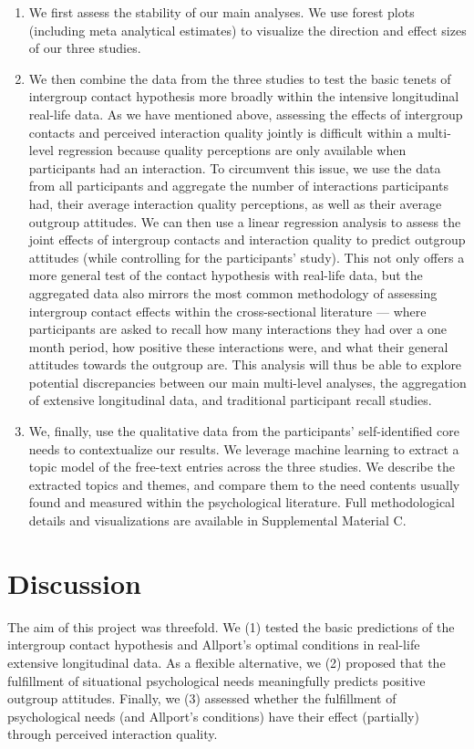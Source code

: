 \documentclass[man, 12pt, a4paper, mask]{apa7}
\theoremstyle{break}
\theoremstyle{plain}
\begin{document}
\begin{enumerate}
\begin{enumerate}
        \item We first assess the stability of our main analyses. We use forest plots (including meta analytical estimates) to visualize the direction and effect sizes of our three studies. 
        \item We then combine the data from the three studies to test the basic tenets of intergroup contact hypothesis more broadly within the intensive longitudinal real-life data. As we have mentioned above, assessing the effects of intergroup contacts and perceived interaction quality jointly is difficult within a multi-level regression because quality perceptions are only available when participants had an interaction. To circumvent this issue, we use the data from all participants and aggregate the number of interactions participants had, their average interaction quality perceptions, as well as their average outgroup attitudes. We can then use a linear regression analysis to assess the joint effects of intergroup contacts and interaction quality to predict outgroup attitudes (while controlling for the participants' study). This not only offers a more general test of the contact hypothesis with real-life data, but the aggregated data also mirrors the most common methodology of assessing intergroup contact effects within the cross-sectional literature --- where participants are asked to recall how many interactions they had over a one month period, how positive these interactions were, and what their general attitudes towards the outgroup are. This analysis will thus be able to explore potential discrepancies between our main multi-level analyses, the aggregation of extensive longitudinal data, and traditional participant recall studies.
        \item We, finally, use the qualitative data from the participants' self-identified core needs to contextualize our results. We leverage machine learning to extract a topic model of the free-text entries across the three studies. We describe the extracted topics and themes, and compare them to the need contents usually found and measured within the psychological literature. Full methodological details and visualizations are available in Supplemental Material C.
    \end{enumerate}
\end{enumerate}





\section{Discussion}
The aim of this project was threefold. We (1) tested the basic predictions of the intergroup contact hypothesis and Allport's optimal conditions in real-life extensive longitudinal data. As a flexible alternative, we (2) proposed that the fulfillment of situational psychological needs meaningfully predicts positive outgroup attitudes. Finally, we (3) assessed whether the fulfillment of psychological needs (and Allport's conditions) have their effect (partially) through perceived interaction quality. 
\end{document}
